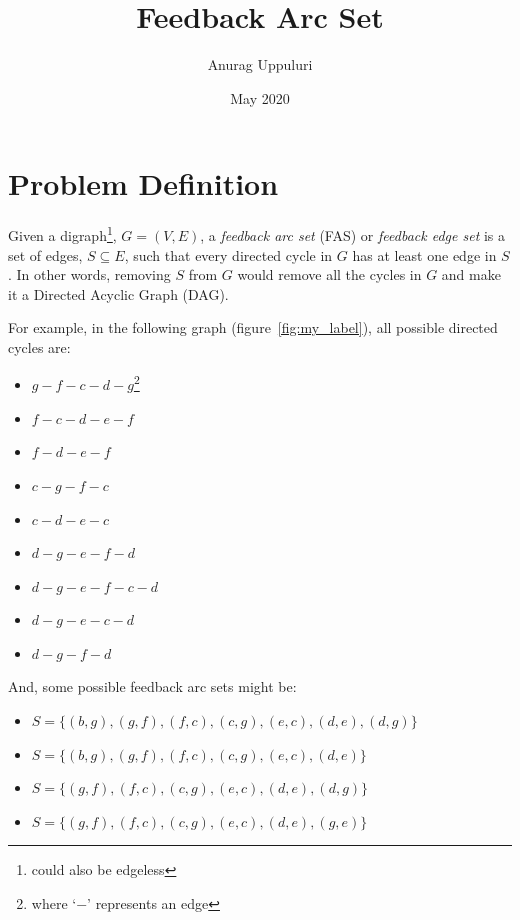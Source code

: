 \documentclass{article}
\title{Feedback Arc Set}
\author{Anurag Uppuluri}
\date{May 2020}
\begin{document}
\maketitle

\section{Problem Definition}
Given a digraph\footnote{could also be edgeless}, $G = (V,E)$, a {\em feedback arc set} (FAS) or {\em feedback edge set} is a set of edges, $S\subseteq E$, such that every directed cycle in $G$ has at least one edge in $S$. In other words, removing $S$ from $G$ would remove all the cycles in $G$ and make it a Directed Acyclic Graph (DAG).~\cite{noauthor_feedback_2020}

For example, in the following graph (figure~\ref{fig:my_label}), all possible directed cycles are:

\begin{itemize}
    \item $g-f-c-d-g$\footnote{where `$-$' represents an edge}
    \item $f-c-d-e-f$
    \item $f-d-e-f$
    \item $c-g-f-c$
    \item $c-d-e-c$
    \item $d-g-e-f-d$
    \item $d-g-e-f-c-d$
    \item $d-g-e-c-d$
    \item $d-g-f-d$
\end{itemize}

And, some possible feedback arc sets might be:

\begin{itemize}
    \item $S = \{(b,g), (g,f), (f,c), (c,g), (e,c), (d,e), (d,g)\}$
    \item $S = \{(b,g), (g,f), (f,c), (c,g), (e,c), (d,e)\}$
    \item $S = \{(g,f), (f,c), (c,g), (e,c), (d,e), (d,g)\}$
    \item $S = \{(g,f), (f,c), (c,g), (e,c), (d,e), (g,e)\}$    
\end{itemize}
\end{document}
